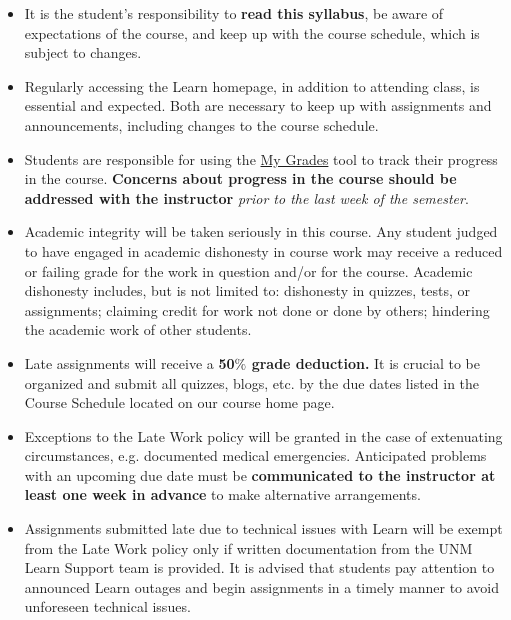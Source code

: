 \documentclass[11pt,a4paper,ragged2e,academicons]{altacv}
\begin{document}
\smallskip

    \begin{itemize}
    		\item It is the student's responsibility to \textbf{read this syllabus}, be aware of expectations of the course, and keep up with the course schedule, which is subject to changes. 
		\item Regularly accessing the Learn homepage, in addition to attending class, is essential and expected. Both are necessary to keep up with assignments and announcements, including changes to the course schedule.
		\item Students are responsible for using the \href{https://learn.unm.edu/webapps/bb-mygrades-BBLEARN/myGrades?course_id=_83571_1&stream_name=mygrades&is_stream=false#_5220464_1}{My Grades} tool to track their progress in the course. \textbf{Concerns about progress in the course should be addressed with the instructor} \textit{prior to the last week of the semester}.  
\item Academic integrity will be taken seriously in this course. Any student judged to have engaged in academic dishonesty in course work may receive a reduced or failing grade for the work in question and/or for the course. Academic dishonesty includes, but is not limited to: dishonesty in quizzes, tests, or assignments;
       claiming credit for work not done or done by others;
       hindering the academic work of other students.
	\end{itemize}
	\smallskip
{}	
\begin{itemize}
			\item Late assignments will receive a \textbf{50$\%$ grade deduction.} It is crucial to be organized and submit all quizzes, blogs, etc. by the due dates listed in the Course Schedule located on our course home page. 
			\item Exceptions to the Late Work policy will be granted in the case of extenuating circumstances, e.g. documented medical emergencies. Anticipated problems with an upcoming due date must be \textbf{communicated to the instructor at least one week in advance} to make alternative arrangements.	
			\item Assignments submitted late due to technical issues with Learn will be exempt from the Late Work policy only if written documentation from the UNM Learn Support team is provided. It is advised that students pay attention to announced Learn outages and begin assignments in a timely manner to avoid unforeseen technical issues.
\end{itemize}
\end{document}
